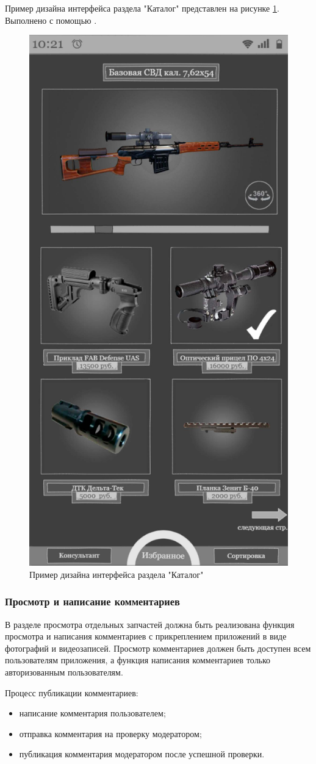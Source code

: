 \documentclass[14pt]{extreport}
\begin{document}
Пример дизайна интерфейса раздела "Каталог" представлен на рисунке \ref{fig22}. Выполнено с помощью \cite{bib8}.

\begin{figure}[H]
\centerline{\includegraphics[width=0.6\linewidth]{pic}}
\caption{Пример дизайна интерфейса раздела "Каталог"}
\label{fig22}
\end{figure}

\subsubsection{Просмотр и написание комментариев}
В разделе просмотра отдельных запчастей должна быть реализована функция просмотра и написания комментариев с прикреплением приложений в виде фотографий и видеозаписей. Просмотр комментариев должен быть доступен всем пользователям приложения, а функция написания комментариев только авторизованным пользователям.

Процесс публикации комментариев:
\begin{itemize}
	\item написание комментария пользователем;
	\item отправка комментария на проверку модератором;
	\item публикация комментария модератором после успешной проверки. 
\end{itemize}
\end{document}
